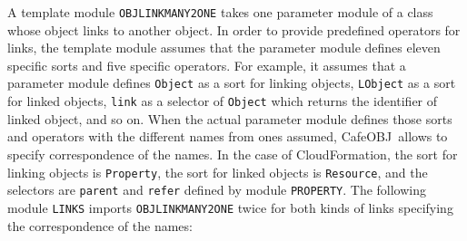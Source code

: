 \documentclass[12pt]{report}
\newcommand{\cafeobj}{{\sf CafeOBJ}~}
\begin{document}
A template module {\tt OBJLINKMANY2ONE} takes one parameter module of
a class whose object links to another object. In order to provide
predefined operators for links, the template module assumes that the
parameter module defines eleven specific sorts and five specific
operators. For example, it assumes that a parameter module defines
{\tt Object} as a sort for linking objects, {\tt LObject} as a sort
for linked objects, {\tt link} as a selector of {\tt Object} which
returns the identifier of linked object, and so on. When the actual
parameter module defines those sorts and operators with the different
names from ones assumed, \cafeobj allows to specify correspondence of
the names. In the case of CloudFormation, the sort for linking objects
is {\tt Property}, the sort for linked objects is {\tt Resource}, and
the selectors are {\tt parent} and {\tt refer} defined by module
{\tt PROPERTY}.  The following module {\tt LINKS} imports
{\tt OBJLINKMANY2ONE} twice for both kinds of links specifying the
correspondence of the names:
\end{document}
